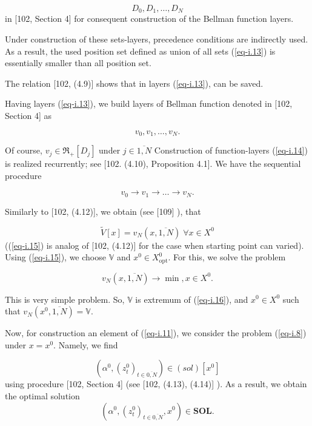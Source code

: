 \documentclass{article}
\begin{document}
\begin{equation}
  \label{eq-i.13}
  D_0, D_1, \dots , D_N
\end{equation}
in
[102, Section 4]  %
for consequent construction of the Bellman function layers.

Under construction of these sets-layers,
precedence conditions are indirectly used.
As a result,
the used position set defined as union of all sets (\ref{eq-i.13})
is essentially smaller than all position set.

The relation
[102, (4.9)]  %
shows that in layers (\ref{eq-i.13}),
can be saved.

Having layers (\ref{eq-i.13}),
we build layers of Bellman function denoted in
[102, Section 4]  %
as

\begin{equation}
  \label{eq-i.14}
  v_0, v_1, \dots , v_N.
\end{equation}

Of course,
$v_j \in \mathfrak R_+[D_j]$
under
$j \in \overline{1,N}$
Construction of function-layers (\ref{eq-i.14})
is realized recurrently;
see
[102. (4.10), Proposition 4.1].   %
We have the sequential procedure

\begin{equation*}
  v_0 \to v_1 \to \dots \to v_N.
\end{equation*}

Similarly to
[102, (4.12)], %
we obtain
(see
[109] %
),
that

\begin{equation}
  \label{eq-i.15}
  \tilde{V}[x] = v_N(x, \overline{1,N})
  \;
  \forall x \in X^0
\end{equation}
((\ref{eq-i.15})
is analog of
[102, (4.12)]   %
for the case when starting point can varied).
Using (\ref{eq-i.15}),
we choose
$\mathbb V$
and
$x^0 \in X^0_{\mathrm{opt}}$.
For this,
we solve the problem

\begin{equation}
  \label{eq-i.16}
  v_N(x, \overline{1,N}) \to \min,
  x \in X^0.
\end{equation}

This is very simple problem.
So,
$\mathbb V$
is extremum of (\ref{eq-i.16}),
and
$x^0 \in X^0$
such that
$v_N(x^0, \overline{1,N}) = \mathbb V$.

Now, for construction an element of (\ref{eq-i.11}),
we consider the problem (\ref{eq-i.8})
under
$x=x^0$.
Namely,
we find

\begin{equation*}
  (\alpha^0, (z_t^0)_{t\in \overline{0,N}}) \in
  (sol)[x^0]
\end{equation*}
using procedure
[102, Section 4]  %
(see
[102, (4.13), (4.14)] %
).
As a result,
we obtain the optimal solution
\begin{equation*}
  (\alpha^0, (z_t^0)_{t\in \overline{0,N}}, x^0)
  \in \mathbf{SOL}.
\end{equation*}
\end{document}
